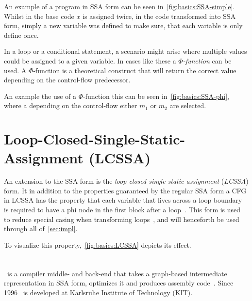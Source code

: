 An example of a program in SSA form can be seen in~\cref{fig:basics:SSA-simple}.
Whilst in the base code $x$ is assigned twice, in the code transformed into SSA form, simply a new variable was defined to make sure, that each variable is only define once.



In a loop or a conditional statement, a scenario might arise where multiple values could be assigned to a given variable.
In cases like these a \textit{$\Phi$-function} can be used.
A $\Phi$-function is a theoretical construct that will return the correct value depending on the control-flow predecessor.

An example the use of a $\Phi$-function this can be seen in~\cref{fig:basics:SSA-phi}, where a depending on the control-flow either $m_1$ or $m_2$ are selected.




\section{Loop-Closed-Single-Static-Assignment (LCSSA)}\label{sec:basics:LCSSA}

An extension to the SSA form is the \textit{loop-closed-single-static-assignment} (\textit{LCSSA}) form.
It in addition to the properties guaranteed by the regular SSA form a CFG in LCSSA has the property that each variable that lives across a loop boundary is required to have a phi node in the first block after a loop~\cite{LLVM_LCSSA}\cite{gcc_lcssa}.
This form is used to reduce special casing when transforming loops~\cite{aebi18bachelorarbeit}, and will henceforth be used through all of~\cref{sec:impl}.

To visualize this property,~\cref{fig:basics:LCSSA} depicts its effect.



\section{\libFIRM}\label{sec:basics:firm}

\libFIRM~is a compiler middle- and back-end that takes a graph-based intermediate representation in SSA form, optimizes it and produces assembly code~\cite{libfirm}.
Since 1996 \libFIRM~is developed at Karlsruhe Institute of Technology (KIT).

